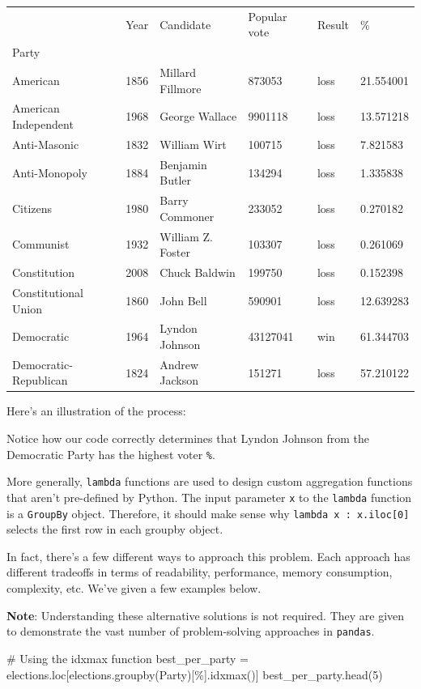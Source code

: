 \documentclass[
  letterpaper,
  DIV=11,
  numbers=noendperiod]{scrreprt}
\newenvironment{Shaded}{\begin{snugshade}}{\end{snugshade}}
\newcommand{\CommentTok}[1]{\textcolor[rgb]{0.37,0.37,0.37}{#1}}
\newcommand{\DecValTok}[1]{\textcolor[rgb]{0.68,0.00,0.00}{#1}}
\newcommand{\NormalTok}[1]{\textcolor[rgb]{0.00,0.23,0.31}{#1}}
\newcommand{\OperatorTok}[1]{\textcolor[rgb]{0.37,0.37,0.37}{#1}}
\newcommand{\StringTok}[1]{\textcolor[rgb]{0.13,0.47,0.30}{#1}}
\begin{document}
\begin{longtable}[]{@{}llllll@{}}
\toprule\noalign{}
& Year & Candidate & Popular vote & Result & \% \\
Party & & & & & \\
\midrule\noalign{}
\endhead
\bottomrule\noalign{}
\endlastfoot
American & 1856 & Millard Fillmore & 873053 & loss & 21.554001 \\
American Independent & 1968 & George Wallace & 9901118 & loss &
13.571218 \\
Anti-Masonic & 1832 & William Wirt & 100715 & loss & 7.821583 \\
Anti-Monopoly & 1884 & Benjamin Butler & 134294 & loss & 1.335838 \\
Citizens & 1980 & Barry Commoner & 233052 & loss & 0.270182 \\
Communist & 1932 & William Z. Foster & 103307 & loss & 0.261069 \\
Constitution & 2008 & Chuck Baldwin & 199750 & loss & 0.152398 \\
Constitutional Union & 1860 & John Bell & 590901 & loss & 12.639283 \\
Democratic & 1964 & Lyndon Johnson & 43127041 & win & 61.344703 \\
Democratic-Republican & 1824 & Andrew Jackson & 151271 & loss &
57.210122 \\
\end{longtable}

Here's an illustration of the process:

Notice how our code correctly determines that Lyndon Johnson from the
Democratic Party has the highest voter \texttt{\%}.

More generally, \texttt{lambda} functions are used to design custom
aggregation functions that aren't pre-defined by Python. The input
parameter \texttt{x} to the \texttt{lambda} function is a
\texttt{GroupBy} object. Therefore, it should make sense why
\texttt{lambda\ x\ :\ x.iloc{[}0{]}} selects the first row in each
groupby object.

In fact, there's a few different ways to approach this problem. Each
approach has different tradeoffs in terms of readability, performance,
memory consumption, complexity, etc. We've given a few examples below.

\textbf{Note}: Understanding these alternative solutions is not
required. They are given to demonstrate the vast number of
problem-solving approaches in \texttt{pandas}.

\begin{Shaded}
\begin{Highlighting}[]
\CommentTok{\# Using the idxmax function}
\NormalTok{best\_per\_party }\OperatorTok{=}\NormalTok{ elections.loc[elections.groupby(}\StringTok{\textquotesingle{}Party\textquotesingle{}}\NormalTok{)[}\StringTok{\textquotesingle{}\%\textquotesingle{}}\NormalTok{].idxmax()]}
\NormalTok{best\_per\_party.head(}\DecValTok{5}\NormalTok{)}
\end{Highlighting}
\end{Shaded}
\end{document}
